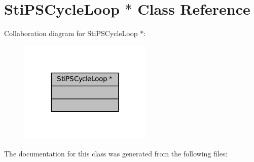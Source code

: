 \hypertarget{classStiPSCycleLoop_01_5}{}\section{Sti\+P\+S\+Cycle\+Loop $\ast$ Class Reference}
\label{classStiPSCycleLoop_01_5}


Collaboration diagram for Sti\+P\+S\+Cycle\+Loop $\ast$\+:
\nopagebreak
\begin{figure}[H]
\begin{center}
\leavevmode
\includegraphics[width=179pt]{classStiPSCycleLoop_01_5__coll__graph}
\end{center}
\end{figure}


The documentation for this class was generated from the following files\+: